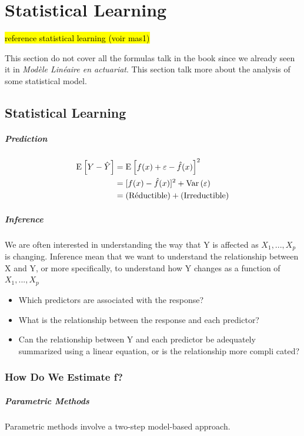 \chapter{Statistical Learning}
\hl{reference statistical learning (voir mas1)}

This section do not cover all the formulas talk in the book since we already seen it in \emph{Modèle Linéaire en actuariat}. This section talk more about the analysis of some statistical model.

\section{Statistical Learning}

\paragraph{Prediction}
\begin{align*}
    \mathrm{E}_{} \left[ Y - \hat{Y} \right] &= \mathrm{E}_{} \left[ f(x) + \varepsilon - \hat{f}(x) \right]^2 \\
                      &= [f(x) - \hat{f}(x)]^2 + \mathrm{Var} \left( \varepsilon \right) \\
                      &= (\text{Réductible}) + (\text{Irreductible)}
\end{align*}

\paragraph{Inference}
We are often interested in understanding the way that Y is affected as $X_1,...,X_p$ is changing. Inference mean that we want to understand the relationship between X and Y, or more specifically, to understand how Y changes as a function of $X_1,...,X_p$ 
\begin{itemize}
    \item Which predictors are associated with the response?
    \item What is the relationship between the response and each predictor?
    \item Can the relationship between Y and each predictor be adequately summarized using a linear equation, or is the relationship more compli cated?
\end{itemize}

\subsection{How Do We Estimate f?}
\paragraph{Parametric Methods}
Parametric methods involve a two-step model-based approach.

